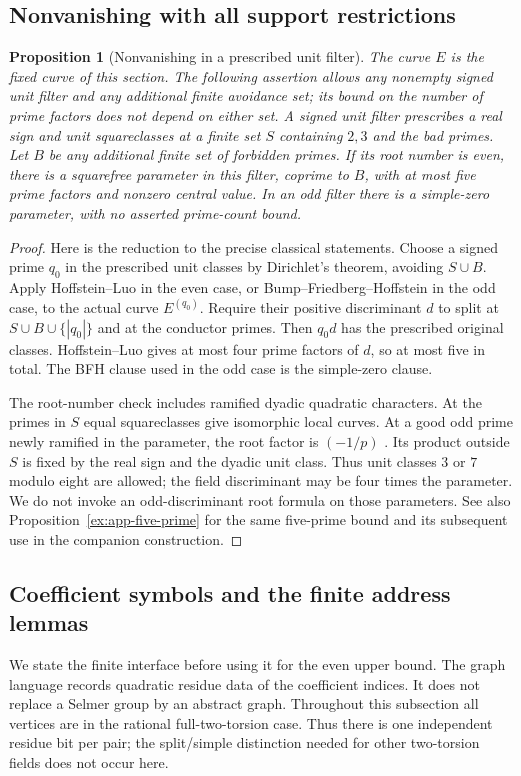 \documentclass[11pt]{article}
\newtheorem{proposition}[theorem]{Proposition}
\theoremstyle{definition}
\theoremstyle{remark}
\begin{document}
\subsection{Nonvanishing with all support restrictions}\label{sec:nonvan}
\begin{proposition}[Nonvanishing in a prescribed unit filter]\label{ex:sec7-nonvanishing}
The curve $E$ is the fixed curve of this section. The following
assertion allows any nonempty signed unit filter and any additional
finite avoidance set; its bound on the number of prime factors does
not depend on either set.
A signed unit filter prescribes a real sign and unit squareclasses at
a finite set $S$ containing $2,3$ and the bad primes. Let $B$ be any
additional finite set of forbidden primes. If its root number is even,
there is a squarefree parameter in this filter, coprime to $B$, with
at most five prime factors and nonzero central value. In an odd filter
there is a simple-zero parameter, with no asserted prime-count bound.

\end{proposition}
\begin{proof}\leavevmode
Here is the reduction to the precise classical statements.
Choose a signed prime $q_0$ in the prescribed unit classes by
Dirichlet's theorem, avoiding $S\cup B$. Apply Hoffstein--Luo
\cite{hl} in the even case, or Bump--Friedberg--Hoffstein
\cite{bfh} in the odd case, to the actual curve $E^{(q_0)}$.
Require their positive discriminant $d$ to split at
$S\cup B\cup\{|q_0|\}$ and at the conductor primes. Then $q_0d$ has
the prescribed original classes. Hoffstein--Luo gives at most four
prime factors of $d$, so at most five in total.
The BFH clause used in the odd case is the simple-zero clause.

The root-number check includes ramified dyadic quadratic characters.
At the primes in $S$ equal squareclasses give isomorphic local curves.
At a good odd prime newly ramified in the parameter, the root factor is
$(-1/p)$ \cite[Proposition 3.3]{desjardins}. Its product outside $S$
is fixed by the real sign and the dyadic unit class. Thus unit classes
$3$ or $7$ modulo eight are allowed; the field discriminant may be four
times the parameter. We do not invoke an odd-discriminant root formula
on those parameters.
See also Proposition~\ref{ex:app-five-prime} for the same
five-prime bound and its subsequent use in the companion construction.
\end{proof}

\subsection{Coefficient symbols and the finite address lemmas}
We state the finite interface before using it for the even upper bound.
The graph language records quadratic residue data of the coefficient
indices. It does not replace a Selmer group by an abstract graph.
Throughout this subsection all vertices are in the rational
full-two-torsion case. Thus there is one independent residue bit per
pair; the split/simple distinction needed for other two-torsion fields
does not occur here.
\end{document}

